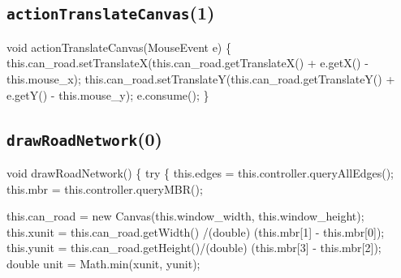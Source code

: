 \subsection{\texttt{actionTranslateCanvas}(1)}
\nwenddocs{}\endmoddef{}
void actionTranslateCanvas(MouseEvent e) \{
  this.can_road.setTranslateX(this.can_road.getTranslateX() + e.getX() - this.mouse_x);
  this.can_road.setTranslateY(this.can_road.getTranslateY() + e.getY() - this.mouse_y);
  e.consume();
\}
\eatline
{}\nwendcode{}\nwdocspar
\subsection{\texttt{drawRoadNetwork}(0)}
\nwenddocs{}\endmoddef{}
void drawRoadNetwork() \{
  try \{
    this.edges    = this.controller.queryAllEdges();
    this.mbr      = this.controller.queryMBR();

    this.can_road = new Canvas(this.window_width, this.window_height);
    this.xunit    = this.can_road.getWidth() /(double) (this.mbr[1] - this.mbr[0]);
    this.yunit    = this.can_road.getHeight()/(double) (this.mbr[3] - this.mbr[2]);
    double unit   = Math.min(xunit, yunit);


